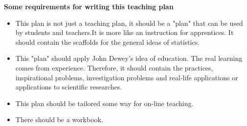 \documentclass[12pt]{article}
\begin{document}
\centering
\textbf{Some requirements for writing this teaching plan}

\begin{itemize}
 \item This plan is not just a teaching plan, it should be a "plan" that can be used by students and teachers.It is more like an instruction for apprentices. It should contain the scaffolds for the general ideas of statistics.
 \item This "plan" should apply John Dewey's idea of education. The real learning comes from experience. Therefore, it should contain the practices, inspirational problems, investigation problems and real-life applications or applications to scientific researches.
 \item This plan should be tailored some way for on-line teaching.
 \item There should be a workbook.
\end{itemize}
\end{document}
